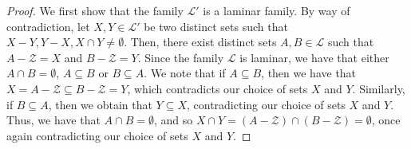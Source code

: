 \documentclass{article}
\providecommand{\calL}{\mathcal{L}}
\providecommand{\calZ}{\mathcal{Z}}
\begin{document}
\projectionLaminarFamily*
\begin{proof}
    We first show that the family $\calL'$ is a laminar family. By way of contradiction, let $X,Y \in \calL'$ be two distinct sets such that $X-Y, Y-X, X\cap Y \not = \emptyset$. Then, there exist distinct sets $A, B \in \calL$ such that $A - \calZ = X$ and $B - \calZ = Y$. Since the family $\calL$ is laminar, we have that either $A\cap B = \emptyset$, $A \subseteq B$ or $B\subseteq A$. We note that if $A\subseteq B$, then we have that $X = A - \calZ \subseteq B - \calZ = Y$, which contradicts our choice of sets $X$ and $Y$. Similarly, if $B\subseteq A$, then we obtain that $Y \subseteq X$, contradicting our choice of sets $X$ and $Y$. Thus, we have that $A\cap B = \emptyset$, and so $X\cap Y = (A - \calZ)\cap(B - \calZ) = \emptyset$, once again contradicting our choice of sets $X$ and $Y$. 


\end{proof}
\end{document}
